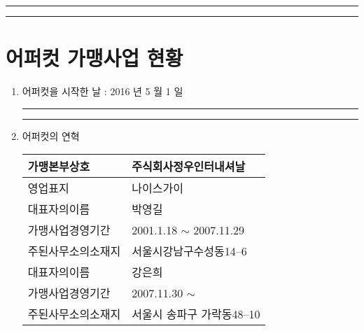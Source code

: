 \documentclass[a5paper,10pt]{oblivoir}
\newcommand\crule[3][black]{\textcolor{#1}{\rule{#2}{#3}}}
\begin{document}
\newpage
\begin{center}
\crule[red]{4cm}{0.1cm} \crule[blue]{4cm}{0.1cm}
\end{center}
\section{ 어퍼컷 가맹사업 현황}
\begin{enumerate}
\item  어퍼컷을 시작한 날 : 2016 년 5 월 1 일


\newpage
\begin{center}
\crule[red]{4cm}{0.1cm} \crule[blue]{4cm}{0.1cm}
\end{center}

\item  어퍼컷의 연혁
\begin{center}
\begin{tiny}
\begin{tabu}{|X[-1]|X|}\hline
가맹본부상호& 주식회사정우인터내셔날\\\hline
영업표지&나이스가이\\\hline
대표자의이름&박영길\\
가맹사업경영기간&2001.1.18 $\sim$ 2007.11.29\\
 주된사무소의소재지&서울시강남구수성동14--6\\\hline
대표자의이름& 강은희\\
가맹사업경영기간&2007.11.30 $\sim$ \\
 주된사무소의소재지& 서울시 송파구 가락동48--10\\\hline
\end{tabu}
\end{tiny}
\end{center}


\end{enumerate}
\end{document}
